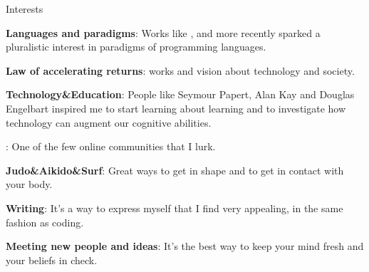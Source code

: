\begin{rubric}{Interests}{

    \entry* \textbf{Languages and paradigms}: Works like
    ,
     and more recently
     sparked a pluralistic interest
    in paradigms of programming languages.

    \entry* \textbf{Law of accelerating returns}:  works and
    vision about technology and society. 

    \entry* \textbf{Technology\&Education}: People like 
    Seymour Papert, Alan Kay and Douglas Engelbart inspired me to
    start learning about learning and to investigate how technology can augment
    our cognitive abilities.

    \entry* \textbf{}: One of the few online
    communities that I lurk.

    \entry* \textbf{Judo\&Aikido\&Surf}: Great ways to get in shape and to get in
    contact with your body.

    \entry* \textbf{Writing}: It's a way to express myself that I find very
    appealing, in the same fashion as coding.

    \entry* \textbf{Meeting new people and ideas}: It's the best way to keep
    your mind fresh and your beliefs in check. 

}\end{rubric}

